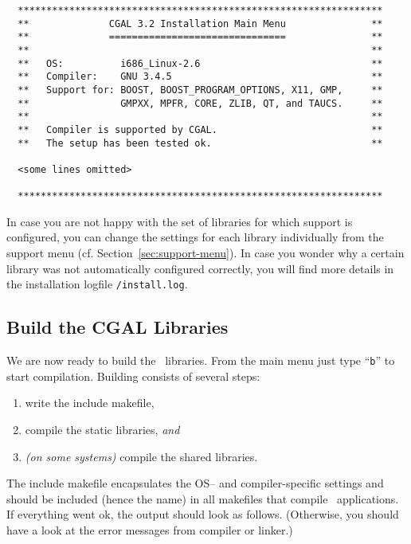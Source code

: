 {\ccTexHtml{\scriptsize}{}
\begin{verbatim}
  ****************************************************************
  **              CGAL 3.2 Installation Main Menu               **
  **              ===============================               **
  **                                                            **
  **   OS:          i686_Linux-2.6                              **
  **   Compiler:    GNU 3.4.5                                   **
  **   Support for: BOOST, BOOST_PROGRAM_OPTIONS, X11, GMP,     **
  **                GMPXX, MPFR, CORE, ZLIB, QT, and TAUCS.     **
  **                                                            **
  **   Compiler is supported by CGAL.                           **
  **   The setup has been tested ok.                            **

  <some lines omitted>

  ****************************************************************
\end{verbatim}
}

In case you are not happy with the set of libraries for which support
is configured, you can change the settings for each library
individually from the support menu (cf.
Section~\ref{sec:support-menu}). In case you wonder why a certain
library was not automatically configured correctly, you will find more
details in the installation logfile \texttt{\cgaldir/install.log}.

\subsection{Build the CGAL Libraries\label{sec:build-the-libs}}

We are now ready to build the \cgal\ libraries. From the main menu
just type ``{\tt b}'' to start compilation. Building consists of
several steps:
\begin{enumerate}
\item write the include makefile,
\item compile the static libraries, \textit{and}
\item \textit{(on some systems)} compile the shared libraries.
\end{enumerate}
The include makefile encapsulates the OS-- and
compiler-specific settings and should be included (hence the name) in
all makefiles that compile \cgal\ applications. If everything went ok,
the output should look as follows. (Otherwise, you should have a look
at the error messages from compiler or linker.)

